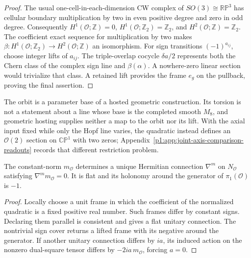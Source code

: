 \documentclass[11pt]{article}
\begin{document}
\begin{proof}
The usual one-cell-in-each-dimension CW complex of
\(SO(3)\cong\mathbb{RP}^3\) has cellular boundary multiplication by two
in even positive degree and zero in odd degree.  Consequently
\(H^1(\mathcal O;\mathbb Z)=0\),
\(H^1(\mathcal O;\mathbb Z_2)=\mathbb Z_2\), and
\(H^2(\mathcal O;\mathbb Z)=\mathbb Z_2\).
The coefficient exact sequence for multiplication by two makes
\(\beta:H^1(\mathcal O;\mathbb Z_2)\to H^2(\mathcal O;\mathbb Z)\)
an isomorphism.  For sign transitions \((-1)^{a_{ij}}\), choose integer
lifts of \(a_{ij}\).  The triple-overlap cocycle \(\delta a/2\) represents
both the Chern class of the complex sign line and \(\beta(\alpha)\).
A nowhere-zero linear section would trivialize that class.  A retained lift
provides the frame \(e_g\) on the pullback, proving the final assertion.
\end{proof}

The orbit is a parameter base of a hosted geometric construction.  Its
torsion is not a statement about a line whose base is the completed smooth
\(M_8\), and geometric hosting supplies neither a map to the orbit nor its
lift.  With the axial input fixed while only the Hopf line varies, the
quadratic instead defines an \(\mathcal O(2)\) section on \(\mathbb{CP}^1\)
with two zeros; Appendix~\ref{p1:app:joint-axis-comparison-readouts} records
that different restriction problem.



\begin{theorem}
\label{p1:thm:joint-comparison-unitary-connection}
The constant-norm \(m_{\mathcal O}\) determines a unique Hermitian
connection \(\nabla^m\) on \(N_{\mathcal O}\) satisfying
\(\nabla^m m_{\mathcal O}=0\).  It is flat and its holonomy around the
generator of \(\pi_1(\mathcal O)\) is \(-1\).
\end{theorem}

\begin{proof}
Locally choose a unit frame in which the coefficient of the normalized
quadratic is a fixed positive real number.  Such frames differ by constant
signs.  Declaring them parallel is consistent and gives a flat unitary
connection.  The nontrivial sign cover returns a lifted frame with its
negative around the generator.  If another unitary connection differs by
\(ia\), its induced action on the nonzero dual-square tensor differs by
\(-2ia\,m_{\mathcal O}\), forcing \(a=0\).
\end{proof}
\end{document}
